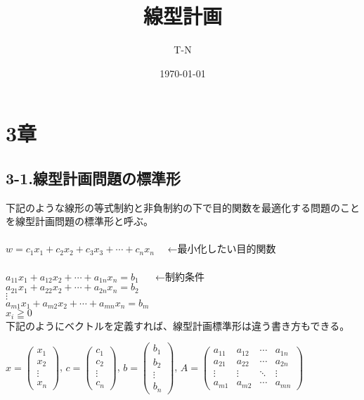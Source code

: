 \documentclass[platex,dvipdfmx]{jlreq}			%
\title{線型計画}
\author{T-N}
\date{\today}
\begin{document}
\maketitle
\section*{3章}

\subsection*{3-1.線型計画問題の標準形}
\noindent
下記のような線形の等式制約と非負制約の下で目的関数を最適化する問題のことを$\textbf{線型計画問題の標準形}$と呼ぶ。\\\\
\large
$ w=c_1x_1+c_2x_2+c_3x_3+\cdots+c_nx_n $ $\quad$←最小化したい目的関数\\\\
$ a_{11}x_1+a_{12}x_2+\cdots+a_{1n}x_n =b_1 $ $\quad$ ←制約条件\\
$ a_{21}x_1+a_{22}x_2+\cdots+a_{2n}x_n =b_2$\\
\hspace{3cm} $\vdots$\\
$ a_{m1}x_1+a_{m2}x_2+\cdots+a_{mn}x_n =b_m$\\
\normalsize
 $x_i\geqq0$\\

\noindent
下記のようにベクトルを定義すれば、線型計画標準形は違う書き方もできる。


$x= \begin{pmatrix}
x_1\\
x_2\\
\vdots\\
x_n
\end{pmatrix}
$, \quad
$c= \begin{pmatrix}
c_1\\
c_2\\
\vdots\\
c_n
\end{pmatrix}
$,\quad
$b= \begin{pmatrix}
b_1\\
b_2\\
\vdots\\
b_n
\end{pmatrix}
$,\quad
$A= \begin{pmatrix}
a_{11} & a_{12} &\cdots & a_{1n}\\
a_{21} & a_{22} &\cdots & a_{2n}\\
\vdots & \vdots &  \ddots &   \vdots \\
a_{m1} & a_{m2}& \cdots &  a_{mn}
\end{pmatrix}
$\\
\end{document}
